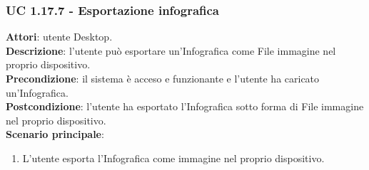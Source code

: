 \subsubsection{UC 1.17.7 - Esportazione infografica}{
	\label{uc1.17.7}
	\textbf{Attori}: utente Desktop. \\
	\textbf{Descrizione}: l'utente può esportare un'Infografica come File immagine nel proprio dispositivo. \\
	\textbf{Precondizione}: il sistema è acceso e funzionante e l'utente ha caricato un'Infografica.	\\
	\textbf{Postcondizione}: l'utente ha esportato l'Infografica sotto forma di File immagine nel proprio dispositivo.\\
	\textbf{Scenario principale}:
	\begin{enumerate}
		\item L'utente esporta l'Infografica come immagine nel proprio dispositivo.
	\end{enumerate}			
	}